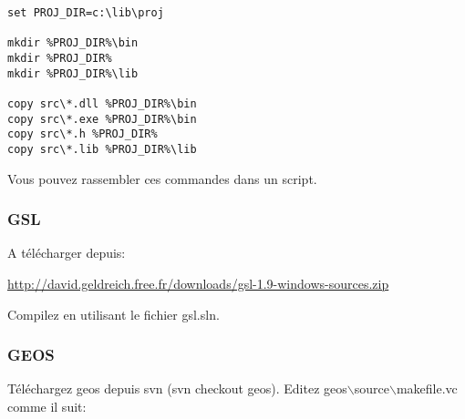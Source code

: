 \begin{verbatim}
set PROJ_DIR=c:\lib\proj

mkdir %PROJ_DIR%\bin
mkdir %PROJ_DIR%
mkdir %PROJ_DIR%\lib

copy src\*.dll %PROJ_DIR%\bin
copy src\*.exe %PROJ_DIR%\bin
copy src\*.h %PROJ_DIR%
copy src\*.lib %PROJ_DIR%\lib 
\end{verbatim}

Vous pouvez rassembler ces commandes dans un script.

% 
% 

\subsubsection{GSL}
A t\'el\'echarger depuis:

\url{http://david.geldreich.free.fr/downloads/gsl-1.9-windows-sources.zip}

Compilez en utilisant le fichier gsl.sln.

% 
% 
% 
% 
% 
% 

\subsubsection{GEOS}
T\'el\'echargez geos depuis svn (svn checkout  geos).
Editez geos$\backslash$source$\backslash$makefile.vc comme il suit:

